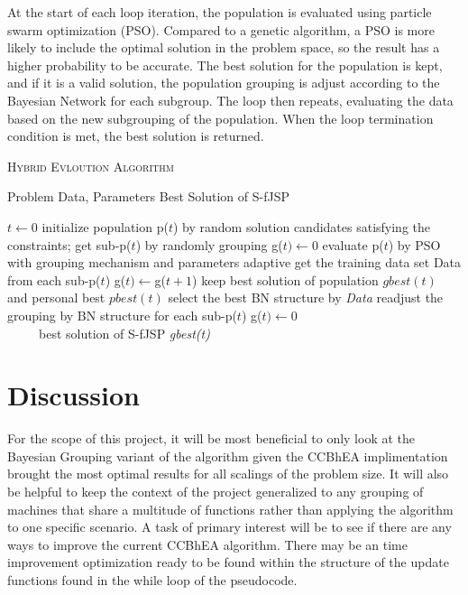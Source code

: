 \documentclass[11pt]{article}
\begin{document}
At the start of each loop iteration, the population is evaluated using particle swarm optimization (PSO). Compared to a genetic algorithm, a PSO is more likely to include the optimal solution in the problem space, so the result has a higher probability to be accurate\cite{sun2015bayesian}. The best solution for the population is kept, and if it is a valid solution, the population grouping is adjust according to the Bayesian Network for each subgroup. The loop then repeats, evaluating the data based on the new subgrouping of the population. When the loop termination condition is met, the best solution is returned.

\begin{algorithm}\caption{\textsc{Hybrid Evloution Algorithm}}
 \begin{algorithmic}[1]
    Problem Data, Parameters
    Best Solution of S-fJSP
   
   \State $t \gets 0$
   \State initialize population p($t$) by random solution candidates satisfying the constraints;
 get sub-p($t$) by randomly grouping
 	\State g($t) \gets 0$
	\State evaluate p($t$) by PSO with grouping mechanism and parameters adaptive
 	\State get the training data set Data from each sub-p($t$)
 	\State g($t) \gets $g($t + 1$)
 	\State keep best solution of population $gbest(t)$ and personal best $pbest(t)$
 	\State select the best BN structure by \textit{Data}
 	\State readjust the grouping by BN structure for each sub-p($t$)
 	\State g($t) \gets 0$
 	\EndIf
        \EndWhile\\
~~~~~\Return best solution of S-fJSP \textit{gbest(t)}
 \end{algorithmic}
\end{algorithm}




\section{Discussion}
For the scope of this project, it will be most beneficial to only look at the Bayesian Grouping variant of the algorithm given the CCBhEA implimentation brought the most optimal results for all scalings of the problem size. It will also be helpful to keep the context of the project generalized to any grouping of machines that share a multitude of functions rather than applying the algorithm to one specific scenario. A task of primary interest will be to see if there are any ways to improve the current CCBhEA algorithm. There may be an time improvement optimization ready to be found within the structure of the update functions found in the while loop of the pseudocode.



\end{document}
